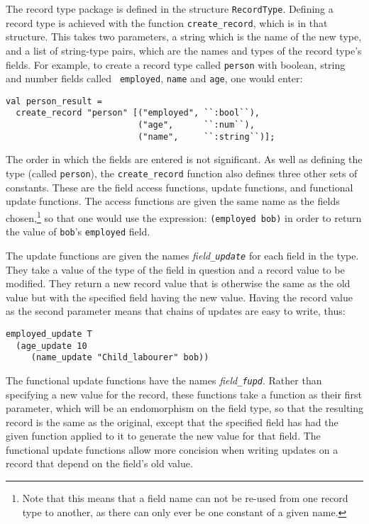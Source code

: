 \documentclass[12pt,fleqn,layout,a4paper]{report}
\begin{document}
\newcommand{\createrec}{{\tt create\_record}} The record type package
is defined in the structure {\tt RecordType}.  Defining a record type
is achieved with the function \createrec, which is in that structure.
This takes two parameters, a string which is the name of the new type,
and a list of string-type pairs, which are the names and types of the
record type's fields.  For example, to create a record type called
{\tt person} with boolean, string and number fields called {\tt
  employed}, {\tt name} and {\tt age}, one would enter:
\begin{verbatim}
val person_result =
  create_record "person" [("employed", ``:bool``),
                          ("age",      ``:num``),
                          ("name",     ``:string``)];
\end{verbatim}
The order in which the fields are entered is not significant. As well as
defining the type (called {\tt person}), the \createrec{} function also
defines three other sets of constants.  These are the field access
functions, update functions, and functional update functions.  The
access functions are given the same name as the fields
chosen,\footnote{Note that this means that a field name can not be
re-used from one record type to another, as there can only ever be one
constant of a given name.} so that one would use the expression:
\mbox{\tt (employed bob)} in order to return the value of {\tt bob}'s
{\tt employed} field.

The update functions are given the names {\it field\tt\_update} for
each field in the type.  They take a value of the type of the field in
question and a record value to be modified.  They return a new record
value that is otherwise the same as the old value but with the
specified field having the new value.  Having the record value as the
second parameter means that chains of updates are easy to write, thus:
\begin{verbatim}
employed_update T
  (age_update 10
     (name_update "Child_labourer" bob))
\end{verbatim}

The functional update functions have the names {\it field\tt\_fupd}.
Rather than specifying a new value for the record, these functions
take a function as their first parameter, which will be an
endomorphism on the field type, so that the resulting record is the
same as the original, except that the specified field has had the
given function applied to it to generate the new value for that
field.  The functional update functions allow more concision when
writing updates on a record that depend on the field's old value.
\end{document}
